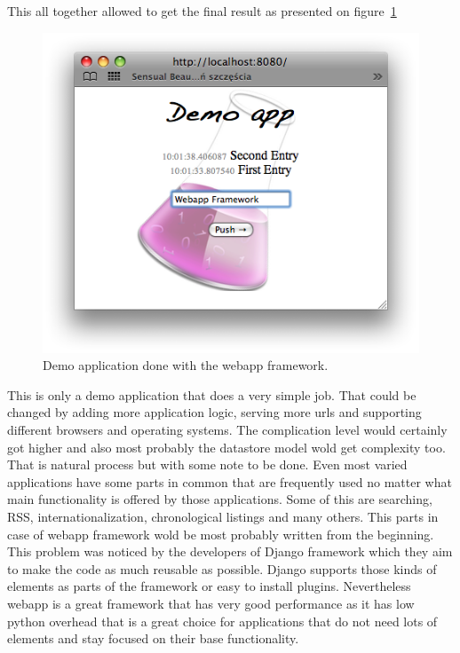 \lstset{caption=Django template system example from the demo application.,label=code:template_sample}

This all together allowed to get the final result as presented on figure~\ref{fig:webapp_sample}
\begin{figure}[ht]
\begin{center}
\includegraphics[scale=0.6]{img/webapp_sample.png}
\caption{Demo application done with the webapp framework.}
\label{fig:webapp_sample}
\end{center}
\end{figure}
This is only a demo application that does a very simple job. That could be changed by adding more application logic, serving more urls and supporting different browsers and operating systems. The complication level would certainly got higher and also most probably the datastore model wold get complexity too. That is natural process but with some note to be done. Even most varied applications have some parts in common that are frequently used no matter what main functionality is offered by those applications. Some of this are searching, RSS, internationalization, chronological listings and many others. This parts in case of webapp framework wold be most probably written from the beginning. This problem was noticed by the developers of Django framework which they aim to make the code as much reusable as possible. Django supports those kinds of elements as parts of the framework or easy to install plugins. Nevertheless  webapp is a great framework that has very good performance as it has low python overhead that is a great choice for applications that do not need lots of elements  and stay focused on their base functionality. 

